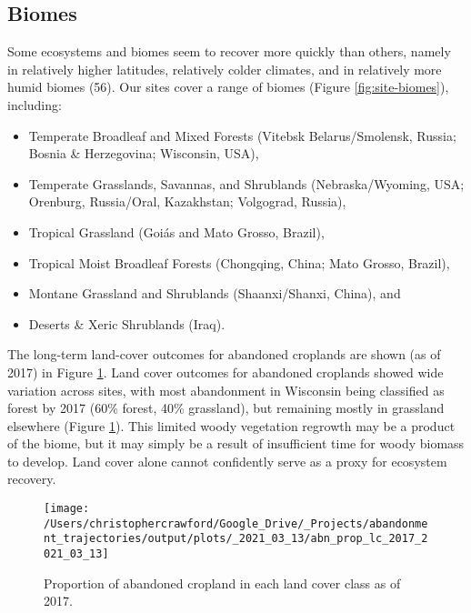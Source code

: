 \documentclass[9pt,twocolumn,twoside,lineno]{pnas-new}
\providecommand{\tightlist}{%
  \setlength{\itemsep}{0pt}\setlength{\parskip}{0pt}}
\begin{document}
\hypertarget{biomes}{%
\subsection{Biomes}\label{biomes}}

Some ecosystems and biomes seem to recover more quickly than others, namely in relatively higher latitudes, relatively colder climates, and in relatively more humid biomes (56).
Our sites cover a range of biomes (Figure \ref{fig:site-biomes}), including:

\begin{itemize}
\tightlist
\item
  Temperate Broadleaf and Mixed Forests (Vitebsk Belarus/Smolensk, Russia; Bosnia \& Herzegovina; Wisconsin, USA),
\item
  Temperate Grasslands, Savannas, and Shrublands (Nebraska/Wyoming, USA; Orenburg, Russia/Oral, Kazakhstan; Volgograd, Russia),
\item
  Tropical Grassland (Goiás and Mato Grosso, Brazil),
\item
  Tropical Moist Broadleaf Forests (Chongqing, China; Mato Grosso, Brazil),
\item
  Montane Grassland and Shrublands (Shaanxi/Shanxi, China), and
\item
  Deserts \& Xeric Shrublands (Iraq).
\end{itemize}

The long-term land-cover outcomes for abandoned croplands are shown (as of 2017) in Figure \ref{fig:abn-prop-lc}.
Land cover outcomes for abandoned croplands showed wide variation across sites, with most abandonment in Wisconsin being classified as forest by 2017 (60\% forest, 40\% grassland), but remaining mostly in grassland elsewhere (Figure \ref{fig:abn-prop-lc}).
This limited woody vegetation regrowth may be a product of the biome, but it may simply be a result of insufficient time for woody biomass to develop.
Land cover alone cannot confidently serve as a proxy for ecosystem recovery.



\begin{figure}
\texttt{[image: /Users/christophercrawford/Google\_Drive/\_Projects/abandonment\_trajectories/output/plots/\_2021\_03\_13/abn\_prop\_lc\_2017\_2021\_03\_13]} \caption{Proportion of abandoned cropland in each land cover class as of 2017.}\label{fig:abn-prop-lc}
\end{figure}
\end{document}

